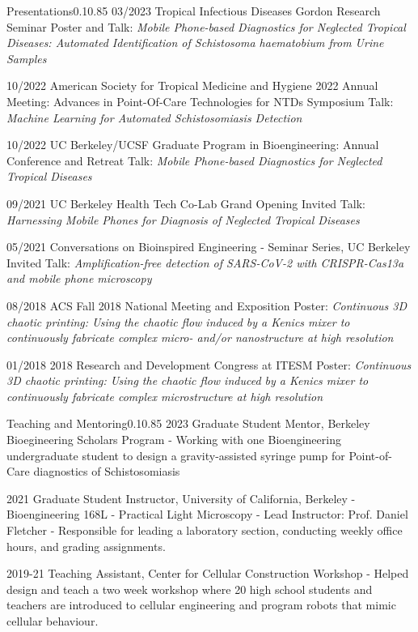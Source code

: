 \documentclass{federico_cv}
\begin{document}
\begin{tblSection}{Presentations}{0.1}{0.85}
\leftbfrightsingle
{03/2023}
{Tropical Infectious Diseases Gordon Research Seminar}
{Poster and Talk: \textit{Mobile Phone-based Diagnostics for Neglected Tropical Diseases: Automated Identification of Schistosoma haematobium from Urine Samples}}

\leftbfrightsingle
{10/2022}
{American Society for Tropical Medicine and Hygiene 2022 Annual Meeting: Advances in Point-Of-Care Technologies for NTDs Symposium}
{Talk: \textit{Machine Learning for Automated Schistosomiasis Detection}}

\leftbfrightsingle
{10/2022}
{UC Berkeley/UCSF Graduate Program in Bioengineering: Annual Conference and Retreat}
{Talk: \textit{Mobile Phone-based Diagnostics for Neglected Tropical Diseases}}

\leftbfrightsingle
{09/2021}
{UC Berkeley Health Tech Co-Lab Grand Opening}
{Invited Talk: \textit{Harnessing Mobile Phones for Diagnosis of Neglected Tropical Diseases}}

\leftbfrightsingle
{05/2021}
{Conversations on Bioinspired Engineering - Seminar Series, UC Berkeley}
{Invited Talk: \textit{Amplification-free detection of SARS-CoV-2 with CRISPR-Cas13a and mobile phone microscopy}}

\leftbfrightsingle
{08/2018}
{ACS Fall 2018 National Meeting and Exposition}
{Poster: \textit{Continuous 3D chaotic printing: Using the chaotic flow induced by a Kenics mixer to continuously fabricate complex micro- and/or nanostructure at high resolution}}

\leftbfrightsingle
{01/2018}
{2018 Research and Development Congress at ITESM}
{Poster: \textit{Continuous 3D chaotic printing: Using the chaotic flow induced by a Kenics mixer to continuously fabricate complex microstructure at high resolution}}

\end{tblSection}


\begin{tblSection}{Teaching and Mentoring}{0.1}{0.85}
\leftbfrightsingle
{2023}
{Graduate Student Mentor, Berkeley Bioegineering Scholars Program}
{- Working with one Bioengineering undergraduate student to design a gravity-assisted syringe pump for Point-of-Care diagnostics of Schistosomiasis}

\leftbfrightsingle
{2021}
{Graduate Student Instructor, University of California, Berkeley}
{- Bioengineering 168L - Practical Light Microscopy}
{- Lead Instructor: Prof. Daniel Fletcher}
{- Responsible for leading a laboratory section, conducting weekly office hours, and grading assignments.}

\leftbfrightsingle
{2019-21}
{Teaching Assistant, Center for Cellular Construction Workshop}
{- Helped design and teach a two week workshop where 20 high school students and teachers are introduced to cellular engineering and program robots that mimic cellular behaviour.}

\end{tblSection}
\end{document}
